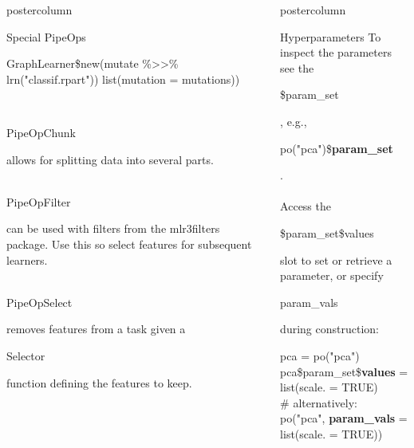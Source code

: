 \documentclass{beamer}
\newlength{\columnheight} %
\newcommand{\codeinline}[1]{\begin{codeboxinline}#1\end{codeboxinline}}
\begin{document}
\begin{frame}[fragile]{}
\begin{columns}
\begin{column}{.245\textwidth}
\begin{beamercolorbox}[center]{postercolumn}
\begin{minipage}{.98\textwidth}
{\begin{myblock}{Special PipeOps}
\begin{codeboxexample}
{                  GraphLearner\$new(mutate \%>{}>\% lrn("classif.rpart"))
                  \hspace*{1ex} list(mutation = mutations))}
                \end{codeboxexample}
                \ \\
                \codeinline{PipeOpChunk} allows for splitting data into several parts.\\
                \ \\
                \codeinline{PipeOpFilter} can be used with filters from the mlr3filters package. Use this so select features for subsequent learners.\\
                \ \\
                \codeinline{PipeOpSelect} removes features from a task given a \codeinline{Selector} function defining the features to keep.
              \end{myblock}
           	\vfill}
				\end{minipage}
			\end{beamercolorbox}
		\end{column}
    \begin{column}{.245\textwidth}
			\begin{beamercolorbox}[center]{postercolumn}
				\begin{minipage}{.98\textwidth}
					\parbox[t][\columnheight]{\textwidth}{
            \begin{myblock}{Hyperparameters}
              To inspect the parameters see the \codeinline{\$param\_set}, e.g., \codeinline{po("pca")\$\textbf{param\_set}}.\\
              \ \\
              Access the \codeinline{\$param\_set\$values} slot to set or retrieve a parameter, or specify \codeinline{param\_vals} during construction:
              \begin{codeboxmultiline}[width=24cm]
                {\footnotesize pca = po("pca") \\
                pca\$param\_set\$\textbf{values} = list(scale. = TRUE) \\
                \# alternatively:\\
                po("pca", \textbf{param\_vals} = list(scale. = TRUE))}
              \end{codeboxmultiline}
              \ \\

\end{myblock}}
\end{minipage}
\end{beamercolorbox}
\end{column}
\end{columns}
\end{frame}
\end{document}
